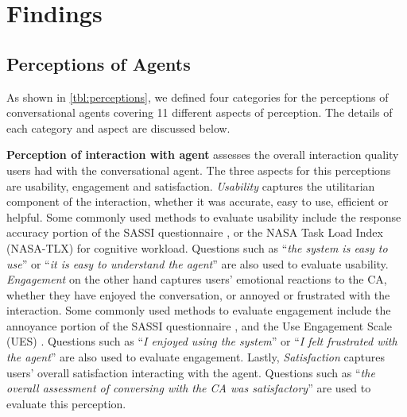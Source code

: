 
\section{Findings}

\subsection{Perceptions of Agents}

As shown in \autoref{tbl:perceptions}, we defined four categories for the perceptions of conversational agents covering 11 different aspects of perception. The details of each category and aspect are discussed below.

\textbf{Perception of interaction with agent} assesses the overall interaction quality users had with the conversational agent. The three aspects for this perceptions are usability, engagement and satisfaction. \textit{Usability} captures the utilitarian component of the interaction, whether it was accurate, easy to use, efficient or helpful. Some commonly used methods to evaluate usability include the response accuracy portion of the SASSI questionnaire \cite{hone2000towards}, or the NASA Task Load Index (NASA-TLX) \cite{hart1988development} for cognitive workload. Questions such as ``\textit{the system is easy to use}'' or ``\textit{it is easy to understand the agent}'' are also used to evaluate usability. \textit{Engagement} on the other hand captures users' emotional reactions to the CA, whether they have enjoyed the conversation, or annoyed or frustrated with the interaction. Some commonly used methods to evaluate engagement include the annoyance portion of the SASSI questionnaire \cite{hone2000towards}, and the Use Engagement Scale (UES) \cite{o2018practical}. Questions such as ``\textit{I enjoyed using the system}'' or ``\textit{I felt frustrated with the agent}'' are also used to evaluate engagement. Lastly, \textit{Satisfaction} captures users' overall satisfaction interacting with the agent. Questions such as ``\textit{the overall assessment of conversing with the CA was satisfactory}'' are used to evaluate this perception.

